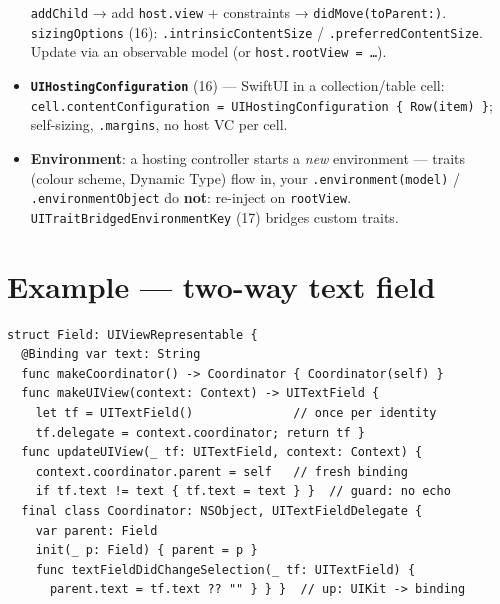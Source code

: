 \documentclass[8pt]{extarticle}
\begin{document}
\begin{multicols}{2}
\begin{itemize}
        \texttt{addChild} → add \texttt{host.view} + constraints → \texttt{didMove(toParent:)}.
        \texttt{sizingOptions} (16): \texttt{.intrinsicContentSize} / \texttt{.preferredContentSize}.
        Update via an observable model (or \texttt{host.rootView = …}).
  \item \textbf{\texttt{UIHostingConfiguration}} (16) — SwiftUI in a collection/table cell:
        \texttt{cell.contentConfiguration = UIHostingConfiguration \{ Row(item) \}}; self-sizing,
        \texttt{.margins}, no host VC per cell.
  \item \textbf{Environment}: a hosting controller starts a \emph{new} environment — traits (colour scheme,
        Dynamic Type) flow in, your \texttt{.environment(model)} / \texttt{.environmentObject} do
        \textbf{not}: re-inject on \texttt{rootView}. \texttt{UITraitBridgedEnvironmentKey} (17) bridges
        custom traits.
\end{itemize}

\section{Example — two-way text field}
\begin{lstlisting}[language=SwiftSheet]
struct Field: UIViewRepresentable {
  @Binding var text: String
  func makeCoordinator() -> Coordinator { Coordinator(self) }
  func makeUIView(context: Context) -> UITextField {
    let tf = UITextField()              // once per identity
    tf.delegate = context.coordinator; return tf }
  func updateUIView(_ tf: UITextField, context: Context) {
    context.coordinator.parent = self   // fresh binding
    if tf.text != text { tf.text = text } }  // guard: no echo
  final class Coordinator: NSObject, UITextFieldDelegate {
    var parent: Field
    init(_ p: Field) { parent = p }
    func textFieldDidChangeSelection(_ tf: UITextField) {
      parent.text = tf.text ?? "" } } }  // up: UIKit -> binding
\end{lstlisting}

\columnbreak


\end{multicols}
\end{document}
